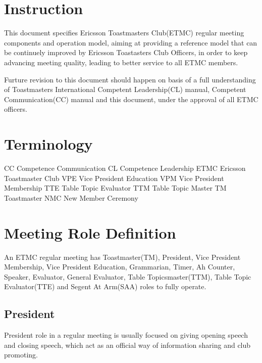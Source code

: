 

\section{Instruction}

This document specifies Ericsson Toastmasters Club(ETMC) regular meeting 
components and operation model, aiming at providing a reference model
that can be continuely improved by Ericsson Toastasters Club Officers, 
in order to keep advancing meeting quality, leading to better service to 
all ETMC members.

Furture revision to this document should happen on basis of a full 
understanding of Toastmasters International Competent Leadership(CL)
manual, Competent Communication(CC) manual and this document, under
the approval of all ETMC officers.

\section{Terminology}

CC   Competence Communication
CL   Competence Leadership
ETMC Ericsson Toastmaster Club
VPE  Vice President Education
VPM  Vice President Membership
TTE  Table Topic Evaluator
TTM  Table Topic Master
TM   Toastmaster
NMC  New Member Ceremony

\section{Meeting Role Definition}

An ETMC regular meeting has Toastmaster(TM), President, Vice President 
Membership, Vice President Education, Grammarian, Timer, Ah Counter,
Speaker, Evaluator, General Evaluator, Table Topicsmaster(TTM), Table 
Topic Evaluator(TTE) and Segent At Arm(SAA) roles to fully operate.  

\subsection{President}

President role in a regular meeting is usually focused on giving opening 
speech and closing speech, which act as an official way of information 
sharing and club promoting.

